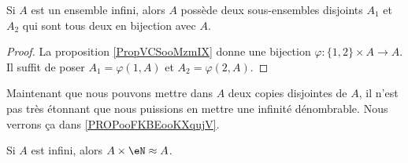 \begin{corollary}       \label{CORooJCSIooOeOICJ}
	Si \( A\) est un ensemble infini, alors \( A\) possède deux sous-ensembles disjoints \( A_1\) et \( A_2\) qui sont tous deux en bijection avec \( A\).
\end{corollary}

\begin{proof}
	La proposition \ref{PropVCSooMzmIX} donne une bijection \( \varphi\colon \{ 1,2 \}\times A\to A\). Il suffit de poser \( A_1=\varphi(1,A)\) et \( A_2=\varphi(2,A)\).
\end{proof}


Maintenant que nous pouvons mettre dans \( A\) deux copies disjointes de \( A\), il n'est pas très étonnant que nous puissions en mettre une infinité dénombrable. Nous verrons ça dans \ref{PROPooFKBEooKXqujV}.





\begin{proposition} \label{PROPooFKBEooKXqujV}
	Si \( A\) est infini, alors \( A\times \eN\approx A\).
\end{proposition}

